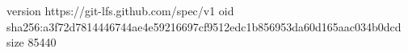 version https://git-lfs.github.com/spec/v1
oid sha256:a3f72d7814446744ae4e59216697cf9512edc1b856953da60d165aac034b0dcd
size 85440
